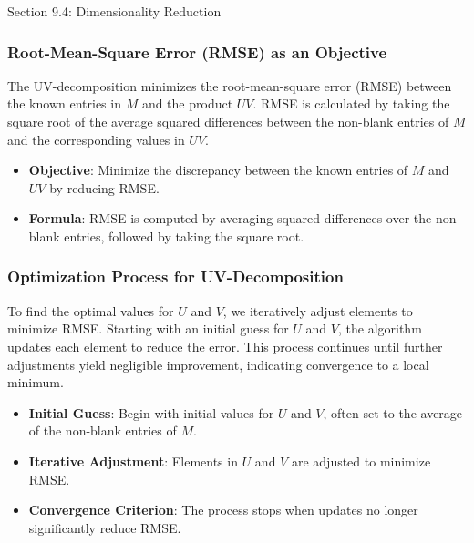 \begin{notes}{Section 9.4: Dimensionality Reduction}
    \subsubsection*{Root-Mean-Square Error (RMSE) as an Objective}
    
    The UV-decomposition minimizes the root-mean-square error (RMSE) between the known entries in $M$ and the product $UV$. RMSE is calculated by taking the square root of the average squared 
    differences between the non-blank entries of $M$ and the corresponding values in $UV$.
    
    \begin{highlight}
        \begin{itemize}
            \item \textbf{Objective}: Minimize the discrepancy between the known entries of $M$ and $UV$ by reducing RMSE.
            \item \textbf{Formula}: RMSE is computed by averaging squared differences over the non-blank entries, followed by taking the square root.
        \end{itemize}
    \end{highlight}
    
    \subsubsection*{Optimization Process for UV-Decomposition}
    
    To find the optimal values for $U$ and $V$, we iteratively adjust elements to minimize RMSE. Starting with an initial guess for $U$ and $V$, the algorithm updates each element to reduce the error. 
    This process continues until further adjustments yield negligible improvement, indicating convergence to a local minimum.
    
    \begin{highlight}
        \begin{itemize}
            \item \textbf{Initial Guess}: Begin with initial values for $U$ and $V$, often set to the average of the non-blank entries of $M$.
            \item \textbf{Iterative Adjustment}: Elements in $U$ and $V$ are adjusted to minimize RMSE.
            \item \textbf{Convergence Criterion}: The process stops when updates no longer significantly reduce RMSE.
        \end{itemize}
    \end{highlight}
    

\end{notes}
